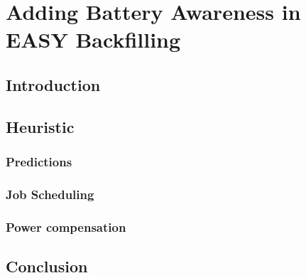 \chapter{Adding Battery Awareness in EASY Backfilling}

\section{Introduction}

\section{Heuristic}

\subsection{Predictions}

\subsection{Job Scheduling}

\subsection{Power compensation}

\section{Conclusion}
